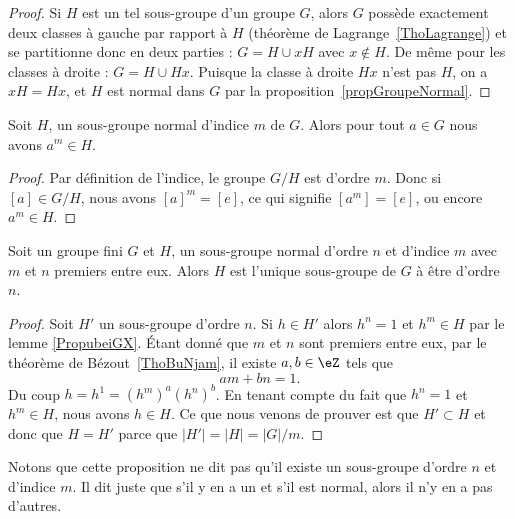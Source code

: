 \begin{proof}
    Si $H$ est un tel sous-groupe d'un groupe $G$, alors $G$ possède exactement deux classes à gauche par rapport à \( H\) (théorème de Lagrange~\ref{ThoLagrange}) et se partitionne donc en deux parties : \( G=H\cup xH\) avec \( x \notin H \). De même pour les classes à droite : \( G=H\cup Hx\). Puisque la classe à droite \( Hx \) n'est pas $H$, on a \( xH = Hx \), et $H$ est normal dans $G$ par la proposition~\ref{propGroupeNormal}.
\end{proof}

\begin{lemma}\label{PropubeiGX}
    Soit \( H\), un sous-groupe normal d'indice \( m\) de \( G\). Alors pour tout \( a\in G\) nous avons \( a^m\in H\).
\end{lemma}

\begin{proof}
    Par définition de l'indice, le groupe \( G/H\) est d'ordre \( m\). Donc si \( [a]\in G/H\), nous avons \( [a]^m=[e]\), ce qui signifie \( [a^m]=[e]\), ou encore \( a^m\in H\).
\end{proof}

\begin{proposition}     \label{PROPooVWVIooQzuAlA}
    Soit un groupe fini \( G\) et \( H\), un sous-groupe normal d'ordre \( n\) et d'indice \( m\) avec \( m\) et \( n\) premiers entre eux. Alors \( H\) est l'unique sous-groupe de \( G\) à être d'ordre \( n\).
\end{proposition}

\begin{proof}
    Soit \( H'\) un sous-groupe d'ordre \( n\). Si \( h\in H'\) alors \( h^n=1\) et \( h^m\in H\) par le lemme \ref{PropubeiGX}. Étant donné que \( m\) et \( n\) sont premiers entre eux, par le théorème de Bézout~\ref{ThoBuNjam}, il existe \( a,b\in \eZ\) tels que
    \begin{equation}
        am+bn=1.
    \end{equation}
    Du coup \( h=h^1=(h^m)^a(h^n)^b\). En tenant compte du fait que \( h^n=1\) et \( h^m\in H\), nous avons \( h\in H\). Ce que nous venons de prouver est que \( H'\subset H\) et donc que \( H=H'\) parce que \( | H' |=| H |=| G |/m\).
\end{proof}

\begin{normaltext}
    Notons que cette proposition ne dit pas qu'il existe un sous-groupe d'ordre \( n\) et d'indice \( m\). Il dit juste que s'il y en a un et s'il est normal, alors il n'y en a pas d'autres.
\end{normaltext}

